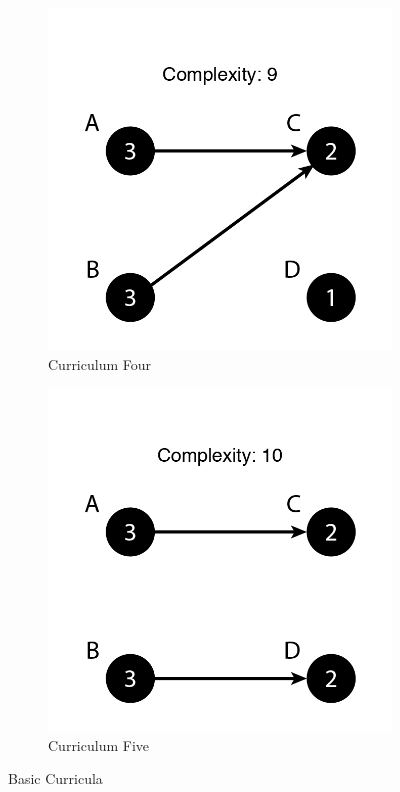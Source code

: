 \documentclass[botnum, fleqn]{unmeethesis}
\begin{document}
\begin{figure}
      \begin{subfigure}[h!]{.3\linewidth}
        \includegraphics[width=\linewidth]{./figures/Simple9-2.png}
        \caption{Curriculum Four}\label{fig:simple92}
      \end{subfigure}
      \begin{subfigure}[h!]{.3\linewidth}
        \includegraphics[width=\linewidth]{./figures/Simple10.png}
        \caption{Curriculum Five}\label{fig:simple10}
      \end{subfigure}

      \caption{Basic Curricula}
      \label{fig:simple}
    \end{figure}
\end{document}
